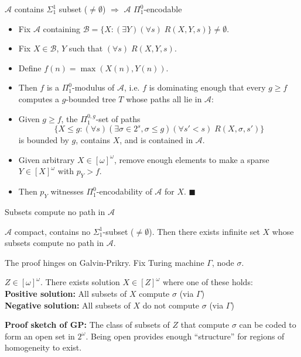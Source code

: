 \begin{frame}{$\mathcal{A}$ contains $\Sigma_1^1$ subset ($\neq\emptyset$)
$\Rightarrow$ $\mathcal{A}$ $\Pi_1^0$-encodable}
  \begin{itemize}
    \item Fix $\mathcal{A}$ containing $\mathcal{B} =\{X: (\exists
      Y)(\forall s)\; R(X,Y,s)\} \neq\emptyset$.
    \item Fix $X\in\mathcal{B}$, $Y$ such that $(\forall s)\;R(X,Y,s)$.
    \item Define $f(n)=\max(X(n),Y(n))$.
    \item Then $f$ is a $\Pi_1^0$-modulus of $\mathcal{A}$, i.e. $f$ is
      dominating enough that every $g\geq f$ computes a $g$-bounded tree
      $T$ whose paths all lie in $\mathcal{A}$:
    \item Given $g\geq f$, the $\Pi_1^{0,g}$-set of paths
      \[\{X\leq g:(\forall s)(\exists \sigma\in 2^s, \sigma\leq g)(\forall
      s'<s)\; R(X,\sigma,s')\}\]
      is bounded by $g$, contains $X$, and is contained in $\mathcal{A}$.
    \item Given arbitrary $X\in[\omega]^\omega$, remove enough elements to
      make a sparse $Y\in[X]^\omega$ with $p_Y>f$.
    \item Then $p_Y$ witnesses $\Pi_1^0$-encodability of $\mathcal{A}$ for
      $X$. $\blacksquare$
  \end{itemize}
\end{frame}

\begin{frame}{Subsets compute no path in $\mathcal{A}$}
  \begin{main-thm*}
    $\mathcal{A}$ compact, contains no $\Sigma_1^1$-subset
    ($\neq\emptyset$). Then there exists infinite set $X$ whose subsets
    compute no path in $\mathcal{A}$.
  \end{main-thm*}

  The proof hinges on Galvin-Prikry. Fix Turing machine $\Gamma$, node
  $\sigma$.
  \begin{fact}
    $Z\in[\omega]^\omega$. There exists solution $X\in[Z]^\omega$
    where one of these holds:\\
    \textbf{Positive solution:} All subsets of $X$ compute $\sigma$
    (via $\Gamma$)\\
    \textbf{Negative solution:} All subsets of $X$ do not compute $\sigma$
    (via $\Gamma$)
  \end{fact}
  \textbf{Proof sketch of GP:} The class of subsets of $Z$ that
  compute $\sigma$ can be coded to form an open set in $2^\omega$. Being
  open provides enough ``structure'' for regions of homogeneity to exist.
\end{frame}

